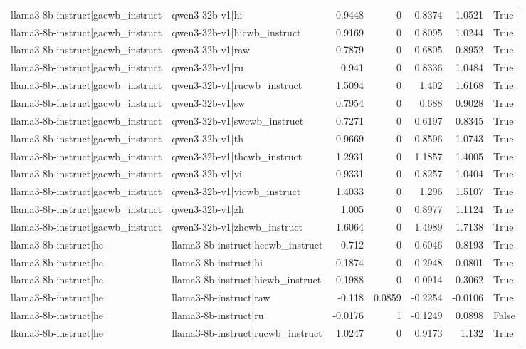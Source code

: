 \begin{table}
\begin{tabular}{l l r r r r l}
llama3-8b-instruct|gacwb_instruct & qwen3-32b-v1|hi & 0.9448 & 0 & 0.8374 & 1.0521 & True \\
llama3-8b-instruct|gacwb_instruct & qwen3-32b-v1|hicwb_instruct & 0.9169 & 0 & 0.8095 & 1.0244 & True \\
llama3-8b-instruct|gacwb_instruct & qwen3-32b-v1|raw & 0.7879 & 0 & 0.6805 & 0.8952 & True \\
llama3-8b-instruct|gacwb_instruct & qwen3-32b-v1|ru & 0.941 & 0 & 0.8336 & 1.0484 & True \\
llama3-8b-instruct|gacwb_instruct & qwen3-32b-v1|rucwb_instruct & 1.5094 & 0 & 1.402 & 1.6168 & True \\
llama3-8b-instruct|gacwb_instruct & qwen3-32b-v1|sw & 0.7954 & 0 & 0.688 & 0.9028 & True \\
llama3-8b-instruct|gacwb_instruct & qwen3-32b-v1|swcwb_instruct & 0.7271 & 0 & 0.6197 & 0.8345 & True \\
llama3-8b-instruct|gacwb_instruct & qwen3-32b-v1|th & 0.9669 & 0 & 0.8596 & 1.0743 & True \\
llama3-8b-instruct|gacwb_instruct & qwen3-32b-v1|thcwb_instruct & 1.2931 & 0 & 1.1857 & 1.4005 & True \\
llama3-8b-instruct|gacwb_instruct & qwen3-32b-v1|vi & 0.9331 & 0 & 0.8257 & 1.0404 & True \\
llama3-8b-instruct|gacwb_instruct & qwen3-32b-v1|vicwb_instruct & 1.4033 & 0 & 1.296 & 1.5107 & True \\
llama3-8b-instruct|gacwb_instruct & qwen3-32b-v1|zh & 1.005 & 0 & 0.8977 & 1.1124 & True \\
llama3-8b-instruct|gacwb_instruct & qwen3-32b-v1|zhcwb_instruct & 1.6064 & 0 & 1.4989 & 1.7138 & True \\
llama3-8b-instruct|he & llama3-8b-instruct|hecwb_instruct & 0.712 & 0 & 0.6046 & 0.8193 & True \\
llama3-8b-instruct|he & llama3-8b-instruct|hi & -0.1874 & 0 & -0.2948 & -0.0801 & True \\
llama3-8b-instruct|he & llama3-8b-instruct|hicwb_instruct & 0.1988 & 0 & 0.0914 & 0.3062 & True \\
llama3-8b-instruct|he & llama3-8b-instruct|raw & -0.118 & 0.0859 & -0.2254 & -0.0106 & True \\
llama3-8b-instruct|he & llama3-8b-instruct|ru & -0.0176 & 1 & -0.1249 & 0.0898 & False \\
llama3-8b-instruct|he & llama3-8b-instruct|rucwb_instruct & 1.0247 & 0 & 0.9173 & 1.132 & True \\

\end{tabular}
\end{table}
